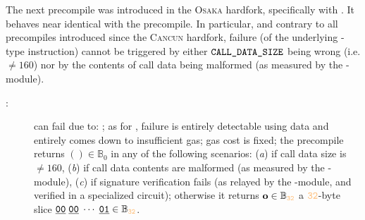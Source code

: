 \noindent The next precompile was introduced in the \textsc{Osaka} hardfork, specifically with \cite{EIP-7951}.
It behaves near identical with the \instEcrecover{} precompile.
In particular, and contrary to all precompiles introduced since the \textsc{Cancun} hardfork,
failure (of the underlying -type instruction) cannot be triggered by either
$\texttt{CALL\_DATA\_SIZE}$ being wrong (i.e. $\neq 160$)
nor by the contents of call data being malformed
(as measured by the \ecDataMod{}-module).
\begin{description}
	\item[\instPVerify{}:]
		can fail due to:
		\locBlsPrecompileFailureReasonGas;
		as for \instEcrecover{}, failure is entirely detectable using \hubMod{} data
		and entirely comes down to insufficient gas;
		gas cost is fixed;
		the precompile returns $() \in \mathbb{B}_{0}$ in any of the following scenarios:
		(\emph{a}) if call data size is $\neq 160$,
		(\emph{b}) if call data contents are malformed (as measured by the \ecDataMod{}-module),
		(\emph{c}) if signature verification fails (as relayed by the \ecDataMod{}-module, and verified in a specialized circuit);
		otherwise it returns $\textbf{o} \in \mathbb{B}_{\evmWordSize}$ a $\evmWordSize$-byte slice
		$ \utt{00} \; \utt{00} \; \cdots \; \utt{01} \in \mathbb{B}_{\evmWordSize}$.
\end{description}
